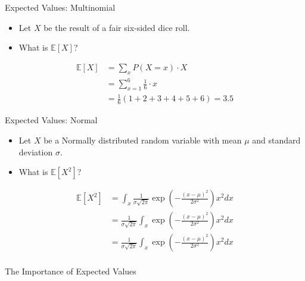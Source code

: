 \documentclass[serif,xcolor=pdftex,dvipsnames,table,hyperref={bookmarks=false,breaklinks}]{beamer}
\begin{document}
\begin{frame}[t]{Expected Values: Multinomial}
	\begin{itemize}[<+->]
		\item Let $X$ be the result of a fair six-sided dice roll.
		\item What is $\mathbb{E}[X]$?
	\end{itemize}
	
	\pause
	\begin{align*}
		\mathbb{E}[X] &= \sum_x P(X=x)\cdot X\\
		&= \sum_{x=1}^6 \frac{1}{6}\cdot x\\
		&= \frac{1}{6}(1+2+3+4+5+6) = 3.5
	\end{align*}
\end{frame}

\begin{frame}[t]{Expected Values: Normal}
	\begin{itemize}[<+->]
		\item Let $X$ be a Normally distributed random variable with mean $\mu$ and standard deviation $\sigma$.
		\item What is $\mathbb{E}[X^2]$?
	\end{itemize}
	\pause
	\begin{align*}
		\mathbb{E}[X^2] &= \int_x \frac{1}{\sigma\sqrt{2\pi}}\exp\left(-\frac{(x-\mu)^2}{2\sigma^2}\right)x^2 dx\\
		&= \frac{1}{\sigma\sqrt{2\pi}}\int_x \exp\left(-\frac{(x-\mu)^2}{2\sigma^2}\right)x^2 dx\\
		&= \frac{1}{\sigma\sqrt{2\pi}}\int_x \exp\left(-\frac{(x-\mu)^2}{2\sigma^2}\right)x^2 dx\\
	\end{align*}
\end{frame}

\begin{frame}[t]{The Importance of Expected Values}
\end{frame}
\end{document}
